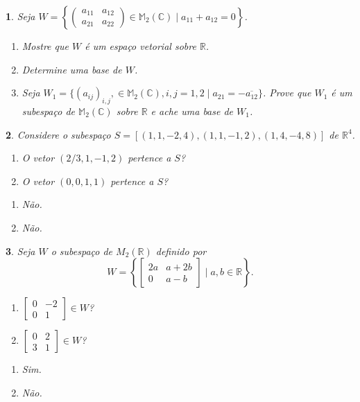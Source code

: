 \documentclass[12pt]{exam}
\newtheorem{exercicio}{}
\newcommand{\real}{\mathbb{R}}
\newcommand{\complex}{\mathbb{C}}
\newcommand{\cp}[1]{\mathbb{#1}}
\begin{document}
\begin{exercicio}
  Seja $W = \left\{\begin{pmatrix} a_{11} & a_{12}\\ a_{21} & a_{22}\end{pmatrix} \in \cp{M}_2(\complex) \mid a_{11} + a_{12} = 0\right\}$.
  \begin{enumerate}[label={\alph*})]
    \item Mostre que $W$ \'e um espa\c{c}o vetorial sobre $\real$.
    \item Determine uma base de $W$.
    \item Seja $W_1 = \{(a_{ij})_{i,j}, \in \cp{M}_2(\complex), i, j = 1, 2 \mid a_{21} = -\overline{a_{12}}\}$. Prove que $W_1$ \'e um subespa\c{c}o de $\cp{M}_2(\complex)$ sobre $\real$ e ache uma base de $W_1$.
  \end{enumerate}
\end{exercicio}

\begin{exercicio}
  Considere o subespa\c{c}o $S = [(1,1,-2,4),(1,1,-1,2),(1,4,-4,8)]$ de $\real^4$.
  \begin{enumerate}[label={\alph*})]
    \item O vetor $(2/3, 1, -1, 2)$ pertence a $S$?
    \item O vetor $(0, 0, 1, 1)$ pertence a $S$?
  \end{enumerate}
  \begin{solucao}
    \begin{enumerate}[label={\alph*})]
      \item N\~ao.
      \item N\~ao.
    \end{enumerate}
  \end{solucao}
\end{exercicio}

\begin{exercicio}
  Seja $W$ o subespa\c{c}o de $M_2(\real)$ definido por
  \[
    W = \left\{\begin{bmatrix}2a & a + 2b\\0 & a - b\end{bmatrix} \mid a, b \in \real\right\}.
  \]
  \begin{enumerate}[label={\alph*})]
      \item $\begin{bmatrix}0 & -2\\0 & 1\end{bmatrix} \in W$?
      \item $\begin{bmatrix}0 & 2\\3 & 1\end{bmatrix} \in W$?
    \end{enumerate}
  \begin{solucao}
  \begin{enumerate}[label={\alph*})]
      \item Sim.
      \item N\~ao.
    \end{enumerate}
  \end{solucao}
\end{exercicio}
\end{document}
